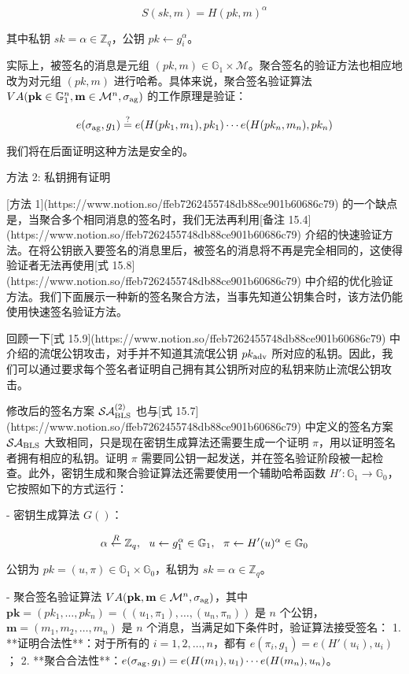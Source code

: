 $$
S(sk,m)=H(pk,m)^\alpha
$$

其中私钥 $sk=\alpha \in \mathbb{Z}_q$，公钥 $pk \leftarrow g_i^\alpha$。

实际上，被签名的消息是元组 $(pk,m)\in \mathbb{G}_1 \times \mathcal{M}$。聚合签名的验证方法也相应地改为对元组 $(pk,m)$ 进行哈希。具体来说，聚合签名验证算法 $VA(\mathbf{pk}\in\mathbb{G}_1^n,\mathbf{m}\in\mathcal{M}^n,\sigma_{\rm ag})$ 的工作原理是验证：

$$
e(\sigma_{\rm ag},g_1)\overset{?}=e(H(pk_1,m_1),pk_1)\cdots e(H(pk_n,m_n),pk_n)
$$

我们将在后面证明这种方法是安全的。

方法 2: 私钥拥有证明

[方法 1](https://www.notion.so/ffeb7262455748db88ce901b60686c79) 的一个缺点是，当聚合多个相同消息的签名时，我们无法再利用[备注 15.4](https://www.notion.so/ffeb7262455748db88ce901b60686c79) 介绍的快速验证方法。在将公钥嵌入要签名的消息里后，被签名的消息将不再是完全相同的，这使得验证者无法再使用[式 15.8](https://www.notion.so/ffeb7262455748db88ce901b60686c79) 中介绍的优化验证方法。我们下面展示一种新的签名聚合方法，当事先知道公钥集合时，该方法仍能使用快速签名验证方法。

回顾一下[式 15.9](https://www.notion.so/ffeb7262455748db88ce901b60686c79) 中介绍的流氓公钥攻击，对手并不知道其流氓公钥 $pk_{\rm adv}$ 所对应的私钥。因此，我们可以通过要求每个签名者证明自己拥有其公钥所对应的私钥来防止流氓公钥攻击。

修改后的签名方案 $\mathcal{SA}_{\rm BLS}^{(2)}$ 也与[式 15.7](https://www.notion.so/ffeb7262455748db88ce901b60686c79) 中定义的签名方案 $\mathcal{SA}_{\rm BLS}$ 大致相同，只是现在密钥生成算法还需要生成一个证明 $\pi$，用以证明签名者拥有相应的私钥。证明 $\pi$ 需要同公钥一起发送，并在签名验证阶段被一起检查。此外，密钥生成和聚合验证算法还需要使用一个辅助哈希函数 $H':\mathbb{G}_1 \to \mathbb{G}_0$，它按照如下的方式运行：

- 密钥生成算法 $G()$：
    
    $$
    \alpha \overset{R}\leftarrow \mathbb{Z}_q,~~u\leftarrow g_1^\alpha\in\mathbb{G}_1,~~\pi\leftarrow H'(u)^\alpha\in\mathbb{G}_0\\
    $$
    
    公钥为 $pk=(u,\pi)\in\mathbb{G}_1\times\mathbb{G}_0$，私钥为 $sk=\alpha\in\mathbb{Z}_q$。
    
- 聚合签名验证算法 $VA(\mathbf{pk},\mathbf{m}\in\mathcal{M}^n,\sigma_{\rm ag})$，其中 $\mathbf{pk}=(pk_1,\dots,pk_n)=((u_1,\pi_1),\dots,(u_n,\pi_n))$ 是 $n$ 个公钥，$\mathbf{m}=(m_1,m_2,\dots,m_n)$ 是 $n$ 个消息，当满足如下条件时，验证算法接受签名：
    1. **证明合法性**：对于所有的 $i=1,2,\dots,n$，都有 $e(\pi_i,g_1)=e(H'(u_i),u_i)$；
    2. **聚合合法性**：$e(\sigma_{\rm ag},g_1)=e(H(m_1),u_1)\cdots e(H(m_n),u_n)$。

